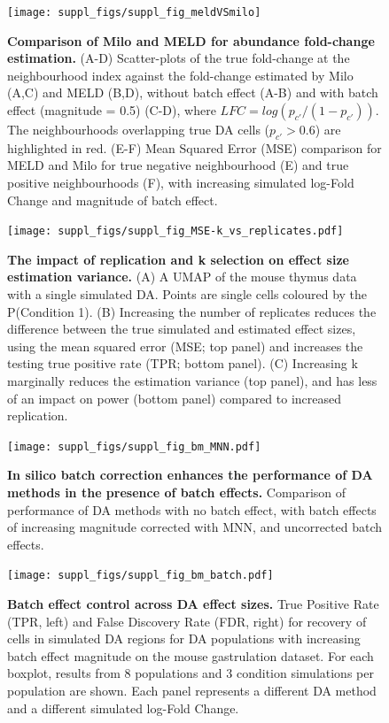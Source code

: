 \documentclass[
]{article}
\begin{document}
\begin{figure}
\texttt{[image: suppl\_figs/suppl\_fig\_meldVSmilo]} \caption{\textbf{Comparison of Milo and MELD for abundance fold-change estimation.} (A-D) Scatter-plots of the true fold-change at the neighbourhood index against the fold-change estimated by Milo (A,C) and MELD (B,D), without batch effect (A-B) and with batch effect (magnitude = 0.5) (C-D), where \(LFC = log(p_{c'}/(1 - p_{c'}))\). The neighbourhoods overlapping true DA cells (\(p_{c'}>0.6\)) are highlighted in red. (E-F) Mean Squared Error (MSE) comparison for MELD and Milo for true negative neighbourhood (E) and true positive neighbourhoods (F), with increasing simulated log-Fold Change and magnitude of batch effect.}\label{fig:sup-fig-bm-meld}
\end{figure}



\begin{figure}
\centering
\texttt{[image: suppl\_figs/suppl\_fig\_MSE-k\_vs\_replicates.pdf]}
\caption{\label{fig:sup-fig-msek}\textbf{The impact of replication and k selection on effect size estimation variance.} (A) A UMAP of the mouse thymus data with a single simulated DA. Points are single cells coloured by the P(Condition 1). (B) Increasing the number of replicates reduces the difference between the true simulated and estimated effect sizes, using the mean squared error (MSE; top panel) and increases the testing true positive rate (TPR; bottom panel). (C) Increasing k marginally reduces the estimation variance (top panel), and has less of an impact on power (bottom panel) compared to increased replication.}
\end{figure}



\begin{figure}
\centering
\texttt{[image: suppl\_figs/suppl\_fig\_bm\_MNN.pdf]}
\caption{\label{fig:sup-fig-bm-mnn}\textbf{In silico batch correction enhances the performance of DA methods in the presence of batch effects.} Comparison of performance of DA methods with no batch effect, with batch effects of increasing magnitude corrected with MNN, and uncorrected batch effects.}
\end{figure}



\begin{figure}
\centering
\texttt{[image: suppl\_figs/suppl\_fig\_bm\_batch.pdf]}
\caption{\label{fig:sup-fig-bm-batch}\textbf{Batch effect control across DA effect sizes.} True Positive Rate (TPR, left) and False Discovery Rate (FDR, right) for recovery of cells in simulated DA regions for DA populations with increasing batch effect magnitude on the mouse gastrulation dataset. For each boxplot, results from 8 populations and 3 condition simulations per population are shown. Each panel represents a different DA method and a different simulated log-Fold Change.}
\end{figure}
\end{document}
